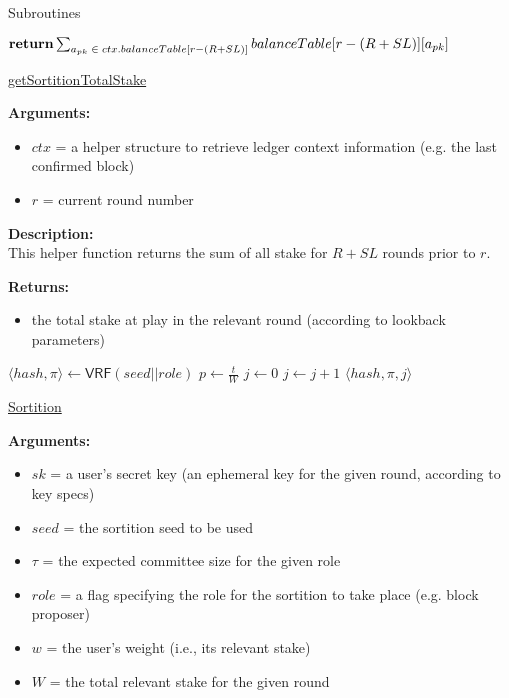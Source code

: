 \documentclass[10pt,a4paper]{article}
\begin{document}
\begin{section}{Subroutines}
\begin{algorithm}[H]
\begin{algorithmic}[1]
        $\Return \sum_{a_{pk}\;\in\;ctx.balanceTable[r - (R + SL)]}{balanceTable[r - (R + SL)][a_{pk}]}$

        \EndFunction
    \end{algorithmic}
    \caption{\underline{getSortitionTotalStake}}
\end{algorithm}

\noindent \textbf{Arguments:}
\begin{itemize}
    \item $ctx$ = a helper structure to retrieve ledger context information (e.g. the last confirmed block)
    \item $r$ = current round number
  \end{itemize}


\noindent \textbf{Description:}\\
This helper function returns the sum of all stake for $R + SL$ rounds prior to $r$.

\noindent \textbf{Returns:}
\begin{itemize}
    \item the total stake at play in the relevant round (according to lookback parameters)
  \end{itemize}


\begin{algorithm}[H]
    \begin{algorithmic}[1]
        \State $ \langle hash, \pi \rangle \gets \mathsf{VRF}(seed||role)$
        \State $p \gets \frac{t}{W}$
        \State $j \gets 0$
        \While{$\frac{hash}{2^{hashlen}}\notin [ \sum_{k=0}^j\mathsf{B}(k;w,p), \sum_{k=0}^{j+1}\mathsf{B}(k;w,p))$}
            \State $j \gets j+1$
        \EndWhile
        \Return $ \langle hash,\pi,j \rangle$
    \EndFunction
    \end{algorithmic}
    \caption{\underline{Sortition}}
\end{algorithm}


\noindent \textbf{Arguments:}
\begin{itemize}
    \item $sk$ = a user's secret key (an ephemeral key for the given round, according to key specs)
    \item $seed$ = the sortition seed to be used
    \item $\tau$ = the expected committee size for the given role
    \item $role$ = a flag specifying the role for the sortition to take place (e.g. block proposer)
    \item $w$ = the user's weight (i.e., its relevant stake)
    \item $W$ = the total relevant stake for the given round
\end{itemize}


\end{section}
\end{document}
